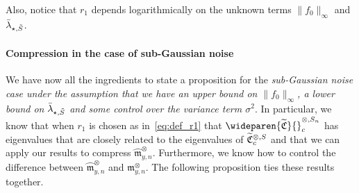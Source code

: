 \documentclass[AHL,Unicode,longabstracts,published]{cedram}
\theoremstyle{remark}
\newcommand{\fkC}{\mathfrak{C}}
\newcommand{\mean}{\mathfrak{m}}
\newcommand{\CovCapn}{\wideparen{\widetilde{\fkC}}{\vphantom{\fkC}}^{\otimes,S_n}_c}
\let\oldtilde\tilde
\renewcommand*{\tilde}[1]{\mathchoice{\widetilde{#1}}{\widetilde{#1}}{\oldtilde{#1}}{\oldtilde{#1}}}
\begin{document}
Also, notice that $r_1$ depends logarithmically on the unknown terms $\|f_0\|_\infty$ and~$\bar \lambda_{\star,\tilde S}$.


\paragraph{Compression in the case of sub-Gaussian noise} We have now all the ingredients to state a proposition for the \emph{sub-Gaussian noise case under the assumption that we have an upper bound on $\|f_0\|_\infty$, a lower bound on $\bar \lambda_{\star,\tilde S}$ and some control over the variance term $\sigma^2$}. In particular, we know that when $r_1$ is chosen as in~\eqref{eq:def_r1} that $\CovCapn$ has eigenvalues that are closely related to the eigenvalues of $\tilde{\fkC}^{\otimes,S}_c$ and that we can apply our results to compress $\wideparen{\mean}_{y,n}^\otimes$. Furthermore, we know how to control the difference between $\wideparen{\mean}_{y,n}^\otimes$ and $\mean_{y,n}^\otimes$. The following proposition ties these results together.
\end{document}
